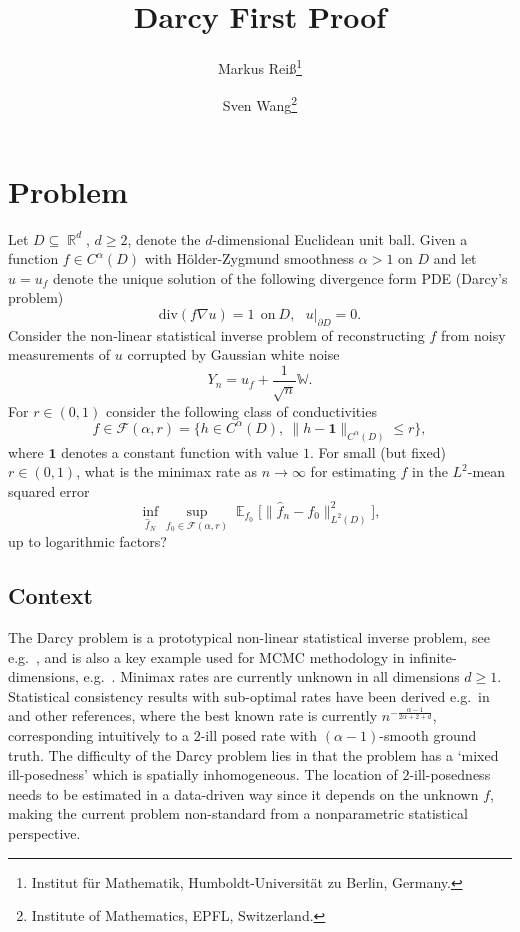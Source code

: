 \documentclass{article}
\title{Darcy First Proof}
\author{
Markus Rei{\ss}\thanks{
Institut für Mathematik, Humboldt-Universität zu Berlin, Germany.
}
\and
Sven Wang{}\footnotemark[2]\thanks{
Institute of Mathematics, EPFL, Switzerland.
}
}
\numberwithin{equation}{section}
\theoremstyle{definition}
\DeclareMathOperator{\E}{{\mathbb E}}
\DeclareMathOperator{\R}{{\mathbb R}}
\renewcommand{\le}{\leqslant}
\renewcommand{\ge}{\geqslant}
\begin{document}
\maketitle


\section{Problem}


Let $D\subseteq \R^d$, $d\ge 2$, denote the $d$-dimensional Euclidean unit ball. Given a function $f\in C^\alpha(D)$ with H\"older-Zygmund smoothness $\alpha > 1$ on $D$ and let $u=u_f$ denote the unique solution of the following divergence form PDE (Darcy's problem)
\[ \text{div}(f\nabla u)=1~~\text{on}~D,~~~u|_{\partial D} = 0.\]
Consider the non-linear statistical inverse problem of reconstructing $f$ from noisy measurements of $u$ corrupted by Gaussian white noise
\[Y_n= u_f + \frac 
1{\sqrt n}\mathbb W.\] For $r\in (0,1)$ consider the following class of conductivities
\[ f\in \mathcal F(\alpha, r) = \{ h\in C^\alpha(D),~\|h-\mathbf 1\|_{C^\alpha(D)} \le r \},\]  
where $\mathbf 1$ denotes a  constant function with value $1$. For small (but fixed) $r\in(0,1)$, what is the minimax rate as $n\to\infty$ for estimating $f$ in the ${L^2}$-mean squared error 
\[ \inf_{\hat f_N}\sup_{f_0\in \mathcal F(\alpha, r)} \E_{f_0}\big[ \|\hat f_n-f_0\|_{L^2(D)}^2\big],  \]
up to logarithmic factors?


\subsection{Context} The Darcy problem is a prototypical non-linear statistical inverse problem, see e.g.~\cite{stuart2010inverse,nickl2023bayesian, cohen2011analytic}, and is also a key example used for MCMC methodology in infinite-dimensions, e.g.~\cite{cotter2013mcmc,hairer2014spectral}. Minimax rates are currently unknown in all dimensions $d\ge 1$. Statistical consistency results with sub-optimal rates have been derived e.g.~in \cite{nickl2020convergence, siebel2024convergence} and other references, where the best known rate is currently $n^{-\frac{\alpha-1}{2\alpha+2+d}}$, corresponding intuitively to a $2$-ill posed rate with $(\alpha-1)$-smooth ground truth. The difficulty of the Darcy problem lies in that the problem has a `mixed ill-posedness' which is spatially inhomogeneous. The location of $2$-ill-posedness needs to be estimated in a data-driven way since it depends on the unknown $f$, making the current problem non-standard from a nonparametric statistical perspective.
\end{document}
